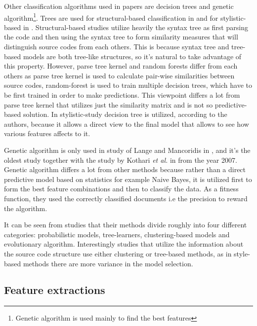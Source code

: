 \documentclass[english]{tktltiki2}
\theoremstyle{definition}
\theoremstyle{remark}
\begin{document}
Other classification algorithms used in papers are decision trees and genetic algorithm\footnote{Genetic algorithm is used mainly to find the best features}. Trees are used for structural-based classification in \cite{Son:2013:APS:2508269.2508323, caliskan2015anonymizing} and for stylistic-based in \cite{Elenbogen:2008:DOS:1295109.1295123}. Structural-based studies utilize heavily the syntax tree as first parsing the code and then using the syntax tree to form similarity measures that will distinguish source codes from each others. This is because syntax tree and tree-based models are both tree-like structures, so it's natural to take advantage of this property. However, parse tree kernel and random forests differ from each others as parse tree kernel is used to calculate pair-wise similarities between source codes, random-forest is used to train multiple decision trees, which have to be first trained in order to make predictions. This viewpoint differs a lot from parse tree kernel that utilizes just the similarity matrix and is not so predictive-based solution. In stylistic-study decision tree is utilized, according to the authors, because it allows a direct view to the final model that allows to see how various features affects to it. 

Genetic algorithm is only used in study of Lange and Mancoridis in \cite{lange2007using}, and it's the oldest study together with the study by Kothari \textit{et al.} in \cite{kothari2007probabilistic} from the year 2007. Genetic algorithm differs a lot from other methods because rather than a direct predictive model based on statistics for example Naive Bayes, it is utilized first to form the best feature combinations and then to classify the data. As a fitness function, they used the correctly classified documents i.e the precision to reward the algorithm.

It can be seen from studies that their methods divide roughly into four different categories: probabilistic models, tree-learners, clustering-based models and evolutionary algorithm. Interestingly studies that utilize the information about the source code structure use either clustering or tree-based methods, as in style-based methods there are more variance in the model selection. 


\subsection{Feature extractions}
\end{document}

